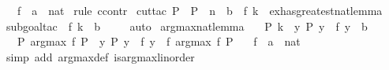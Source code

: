 \begin{isabellebody}
\ \ \ f\ {\isacharcolon}{\kern0pt}{\isacharcolon}{\kern0pt}\ {\isachardoublequoteopen}{\isacharprime}{\kern0pt}a\ {\isasymRightarrow}\ nat{\isachardoublequoteclose}\isanewline
%
\isadelimproof
%
\endisadelimproof
%
\isatagproof
{}\isamarkupfalse%
\ {\isacharparenleft}{\kern0pt}rule\ ccontr{\isacharparenright}{\kern0pt}\isanewline
{}\isamarkupfalse%
\ {\isacharparenleft}{\kern0pt}cut{\isacharunderscore}{\kern0pt}tac\ P\ {\isacharequal}{\kern0pt}\ P\ \ n\ {\isacharequal}{\kern0pt}\ {\isachardoublequoteopen}b\ {\isacharminus}{\kern0pt}\ f\ k{\isachardoublequoteclose}\ \ ex{\isacharunderscore}{\kern0pt}has{\isacharunderscore}{\kern0pt}greatest{\isacharunderscore}{\kern0pt}nat{\isacharunderscore}{\kern0pt}lemma{\isacharparenright}{\kern0pt}\isanewline
\ \ \isamarkupfalse%
\ {\isacharparenleft}{\kern0pt}subgoal{\isacharunderscore}{\kern0pt}tac\ {\isacharbrackleft}{\kern0pt}{}{\isacharbrackright}{\kern0pt}\ {\isachardoublequoteopen}f\ k\ {\isasymle}\ b{\isachardoublequoteclose}{\isacharparenright}{\kern0pt}\isanewline
\ \ \ \isamarkupfalse%
\ auto\isanewline
{}\isamarkupfalse%
%
\endisatagproof
{\isafoldproof}%
%
\isadelimproof
\isanewline
%
\endisadelimproof
\isanewline
{}\isamarkupfalse%
\ arg{\isacharunderscore}{\kern0pt}max{\isacharunderscore}{\kern0pt}nat{\isacharunderscore}{\kern0pt}lemma{\isacharcolon}{\kern0pt}\isanewline
\ \ {\isachardoublequoteopen}{\isasymlbrakk}\ P\ k{\isacharsemicolon}{\kern0pt}\ \ {\isasymforall}y{\isachardot}{\kern0pt}\ P\ y\ {\isasymlongrightarrow}\ f\ y\ {\isacharless}{\kern0pt}\ b\ {\isasymrbrakk}\isanewline
\ \ {\isasymLongrightarrow}\ P\ {\isacharparenleft}{\kern0pt}arg{\isacharunderscore}{\kern0pt}max\ f\ P{\isacharparenright}{\kern0pt}\ {\isasymand}\ {\isacharparenleft}{\kern0pt}{\isasymforall}y{\isachardot}{\kern0pt}\ P\ y\ {\isasymlongrightarrow}\ f\ y\ {\isasymle}\ f\ {\isacharparenleft}{\kern0pt}arg{\isacharunderscore}{\kern0pt}max\ f\ P{\isacharparenright}{\kern0pt}{\isacharparenright}{\kern0pt}{\isachardoublequoteclose}\isanewline
\ \ \ f\ {\isacharcolon}{\kern0pt}{\isacharcolon}{\kern0pt}\ {\isachardoublequoteopen}{\isacharprime}{\kern0pt}a\ {\isasymRightarrow}\ nat{\isachardoublequoteclose}\isanewline
%
\isadelimproof
%
\endisadelimproof
%
\isatagproof
{}\isamarkupfalse%
\ {\isacharparenleft}{\kern0pt}simp\ add{\isacharcolon}{\kern0pt}\ arg{\isacharunderscore}{\kern0pt}max{\isacharunderscore}{\kern0pt}def\ is{\isacharunderscore}{\kern0pt}arg{\isacharunderscore}{\kern0pt}max{\isacharunderscore}{\kern0pt}linorder{\isacharparenright}{\kern0pt}\isanewline

\end{isabellebody}
